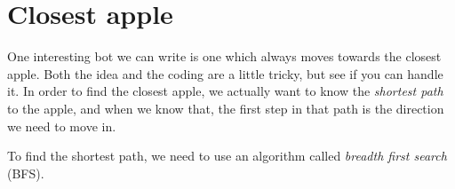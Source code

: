 \section{Closest apple}

One interesting bot we can write is one which always moves towards the closest
apple. Both the idea and the coding are a little tricky, but see if you can
handle it. In order to find the closest apple, we actually want to know
the \emph{shortest path} to the apple, and when we know that, the first step in
that path is the direction we need to move in.

To find the shortest path, we need to use an algorithm called
\emph{breadth first search} (BFS).

\ifshowcode
{}
\fi
